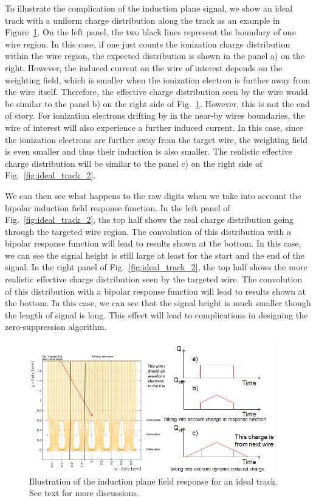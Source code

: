 To illustrate the complication of the induction plane signal, we show an ideal track with a uniform charge 
distribution along the track as an example in Figure~\ref{fig:ideal_track_1}.
On the left panel, the two black lines represent the boundary of one wire region. In this case, 
if one just counts the ionization charge distribution within the wire region, the expected 
distribution is shown in the panel a) on the right.  However, the induced current on the wire of 
interest depends on the weighting field, which is smaller when the ionization electron is 
further away from the wire itself. Therefore, the effective charge distribution seen by 
the wire would be similar to the panel b) on the right side of 
Fig.~\ref{fig:ideal_track_1}. However, this is not the end of story. For ionization electrons 
drifting by in the near-by wires boundaries, the wire of interest will also experience a 
further induced current. In this case, since the ionization electrons are further away 
from the target wire, the weighting field is even smaller and thus their induction is 
also smaller. The realistic effective charge distribution will be similar to the panel c) on 
the right side of Fig.~\ref{fig:ideal_track_2}. 

We can then see what happens to the raw digits when we take into account the bipolar induction 
field response function. In the left panel of Fig.~\ref{fig:ideal_track_2}, the top half shows 
the real charge distribution going through the targeted wire region. The convolution of this 
distribution with a bipolar response function will lead to results shown at the bottom. In this 
case, we can see the signal height is still large at least for the start and the end of the 
signal. In the right panel of Fig.~\ref{fig:ideal_track_2}, the top half shows the more 
realistic effective charge distribution seen by the targeted wire. The convolution of this 
distribution with a bipolar response function will lead to results shown at the bottom. In 
this case, we can see that the signal height is much smaller though the length of signal is 
long. This effect will lead to complications in designing the zero-suppression algorithm.


\begin{figure}[!h!tbp]
\includegraphics[width=0.95\textwidth]{figures/ideal_track.png}
\caption{Illustration of the induction plane field response for an ideal track. See text for more 
discussions. }
\label{fig:ideal_track_1}
\end{figure}

